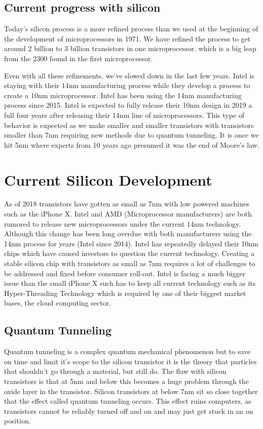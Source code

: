 \documentclass[journal]{IEEEtran}
\begin{document}
\subsection{Current progress with silicon}
Today's silicon process is a more refined process than we used at the beginning of the development of microprocessors in 1971. We have refined the process to get around 2 billion to 3 billion transistors in one microprocessor. which is a big leap from the 2300 found in the first microprocessor.

Even with all these refinements, we've slowed down in the last few years. Intel is staying with their 14nm manufacturing process while they develop a process to create a 10nm microprocessor. Intel has been using the 14nm manufacturing process since 2015. Intel is expected to fully release their 10nm design in 2019 a full four years after releasing their 14nm line of microprocessors. This type of behavior is expected as we make smaller and smaller transistors with transistors smaller than 7nm requiring new methods due to quantum tunneling. It is once we hit 5nm where experts from 10 years ago presumed it was the end of Moore's law. \cite{591665}

\section{Current Silicon Development}
As of 2018 transistors have gotten as small as 7nm with low powered machines such as the iPhone X. Intel and AMD (Microprocessor manufacturers) are both rumored to release new microprocessors under the current 14nm technology. Although this change has been long overdue with both manufacturers using the 14nm process for years (Intel since 2014). Intel has repeatedly delayed their 10nm chips \cite{dent_2018} which have caused investors to question the current technology. Creating a stable silicon chip with transistors as small as 7nm requires a lot of challenges to be addressed and fixed before consumer roll-out. Intel is facing a much bigger issue than the small iPhone X such has to keep all current technology such as its Hyper-Threading Technology which is required by one of their biggest market bases, the cloud computing sector. 

\subsection{Quantum Tunneling}
Quantum tunneling is a complex quantum mechanical phenomenon \cite{70394920140101} but to save on time and limit it's scope to the silicon transistor it is the theory that particles that shouldn't go through a material, but still do. The flaw with silicon transistors is that at 5nm and below this becomes a huge problem through the oxide layer in the transistor. Silicon transistors at below 7nm sit so close together that the effect called quantum tunneling occurs. This effect ruins computers, as transistors cannot be reliably turned off and on and may just get stuck in an on position.
\end{document}
